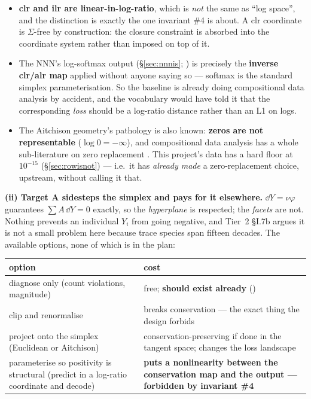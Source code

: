 \begin{itemize}
\item \textbf{clr and ilr are linear-in-log-ratio}, which is \emph{not} the
  same as ``log space'', and the distinction is exactly the one invariant \#4
  is about. A clr coordinate is $\Sigma$-free by construction: the closure
  constraint is absorbed into the coordinate system rather than imposed on top
  of it.
\item The NNN's log-softmax output (\S\ref{sec:nnnis};
  \citealt[\S 2.3--2.4]{grichener2025}) is precisely the \textbf{inverse
  clr/alr map} applied without anyone saying so --- softmax is the standard
  simplex parameterisation. So the baseline is already doing compositional data
  analysis by accident, and the vocabulary would have told it that the
  corresponding \emph{loss} should be a log-ratio distance rather than an L1 on
  logs.
\item The Aitchison geometry's pathology is also known: \textbf{zeros are not
  representable} ($\log 0 = -\infty$), and compositional data analysis has a
  whole sub-literature on zero replacement \citep[e.g.][]{martinfernandez2003}.
  This project's data has a hard floor at $10^{-15}$ (\S\ref{sec:rowisnot}) ---
  i.e.\ it has \emph{already made} a zero-replacement choice, upstream, without
  calling it that.
\end{itemize}

\textbf{(ii) Target A sidesteps the simplex and pays for it elsewhere.}
$\dd Y = \nu\varphi$ guarantees $\sum A\,\dd Y = 0$ exactly, so the
\emph{hyperplane} is respected; the \emph{facets} are not. Nothing prevents an
individual $Y_i$ from going negative, and Tier~2 \S I.7b argues it is not a
small problem here because trace species span fifteen decades. The available
options, none of which is in the plan:

\begingroup\small
\begin{tabularx}{\textwidth}{@{}L{6.4cm} Y@{}}
\toprule
\textbf{option} & \textbf{cost} \\
\midrule
diagnose only (count violations, magnitude) & free; \textbf{should exist
  already} () \\
clip and renormalise & breaks conservation --- the exact thing the design
  forbids \\
project onto the simplex (Euclidean or Aitchison) & conservation-preserving if
  done in the tangent space; changes the loss landscape \\
parameterise so positivity is structural (predict in a log-ratio coordinate
  and decode) & \textbf{puts a nonlinearity between the conservation map and
  the output --- forbidden by invariant \#4} \\
\bottomrule
\end{tabularx}
\endgroup

